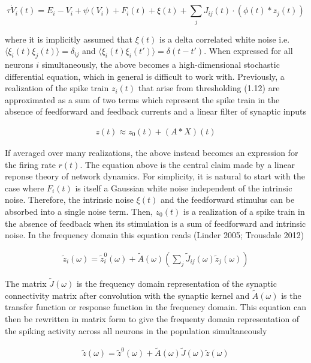 \documentclass{ucetd}
\begin{document}
\begin{equation}
\tau\dot{V}_{i}(t) = E_{i} - V_{i} + \psi(V_{i}) + F_{i}(t) + \xi(t) + \sum_{j} J_{ij}(t)\cdot \left(\phi(t) * z_{j}(t)\right)
\end{equation}

where it is implicitly assumed that $\xi(t)$ is a delta correlated white noise i.e. $\langle\xi_{i}(t)\xi_{j}(t)\rangle = \delta_{ij}$ and $\langle\xi_{i}(t)\xi_{i}(t')\rangle = \delta(t-t')$. When expressed for all neurons $i$ simultaneously, the above becomes a high-dimensional stochastic differential equation, which in general is difficult to work with. Previously, a realization of the spike train $z_{i}(t)$ that arise from thresholding (1.12) are approximated as a sum of two terms which represent the spike train in the absence of feedforward and feedback currents and a linear filter of synaptic inputs

\begin{align}
z(t) \approx z_{0}(t) + (A * X)(t) 
\end{align}

If averaged over many realizations, the above instead becomes an expression for the firing rate $r(t)$. The equation above is the central claim made by a linear reponse theory of network dynamics. For simplicity, it is natural to start with the case where $F_{i}(t)$ is itself a Gaussian white noise independent of the intrinsic noise. Therefore, the intrinsic noise $\xi(t)$ and the feedforward stimulus can be absorbed into a single noise term. Then, $z_{0}(t)$ is a realization of a spike train in the absence of feedback when its stimulation is a sum of feedforward and intrinsic noise. In the frequency domain this equation reads (Linder 2005; Trousdale 2012)

\begin{align}
\tilde{z}_{i}(\omega) = \tilde{z}_{i}^{0}(\omega) + \tilde{A}(\omega)\left(\sum_{j}\tilde{J}_{ij}(\omega)\tilde{z}_{j}(\omega)\right)
\end{align}

The matrix $\tilde{J}(\omega)$ is the frequency domain representation of the synaptic connectivity matrix after convolution with the synaptic kernel and $\tilde{A}(\omega)$ is the transfer function or response function in the frequency domain. This equation can then be rewritten in matrix form to give the frequenty domain representation of the spiking activity across all neurons in the population simultaneously

\begin{align}
\tilde{z}(\omega) = \tilde{z}^{0}(\omega) + \tilde{A}(\omega)\tilde{J}(\omega)\tilde{z}(\omega)
\end{align}
\end{document}

